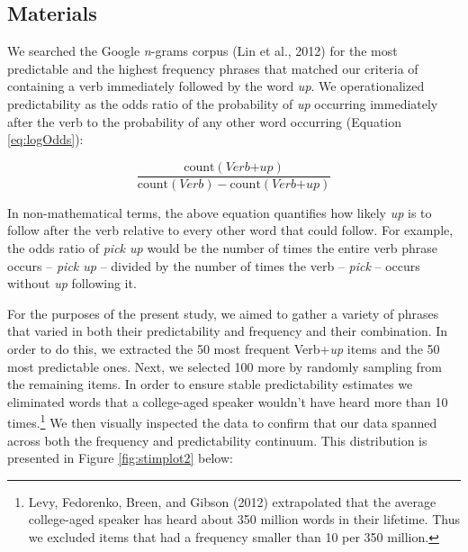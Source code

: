 \documentclass[
  man,floatsintext]{apa6}
\begin{document}
\subsection{Materials}\label{materials}

We searched the Google \emph{n}-grams corpus (Lin et al., 2012) for the most predictable and the highest frequency phrases that matched our criteria of containing a verb immediately followed by the word \emph{up}. We operationalized predictability as the odds ratio of the probability of \emph{up} occurring immediately after the verb to the probability of any other word occurring (Equation \eqref{eq:logOdds}):

\begin{equation}
\label{eq:logOdds}
\frac{\mathrm{count(\textit{Verb+up})}}{\mathrm{count(\textit{Verb})} - \mathrm{count(\textit{Verb+up})}} 
\end{equation}

In non-mathematical terms, the above equation quantifies how likely \emph{up} is to follow after the verb relative to every other word that could follow. For example, the odds ratio of \emph{pick up} would be the number of times the entire verb phrase occurs -- \emph{pick up} -- divided by the number of times the verb -- \emph{pick} -- occurs without \emph{up} following it.

For the purposes of the present study, we aimed to gather a variety of phrases that varied in both their predictability and frequency and their combination. In order to do this, we extracted the 50 most frequent Verb+\emph{up} items and the 50 most predictable ones. Next, we selected 100 more by randomly sampling from the remaining items. In order to ensure stable predictability estimates we eliminated words that a college-aged speaker wouldn't have heard more than 10 times.\footnote{Levy, Fedorenko, Breen, and Gibson (2012) extrapolated that the average college-aged speaker has heard about 350 million words in their lifetime. Thus we excluded items that had a frequency smaller than 10 per 350 million.} We then visually inspected the data to confirm that our data spanned across both the frequency and predictability continuum. This distribution is presented in Figure \ref{fig:stimplot2} below:
\end{document}

